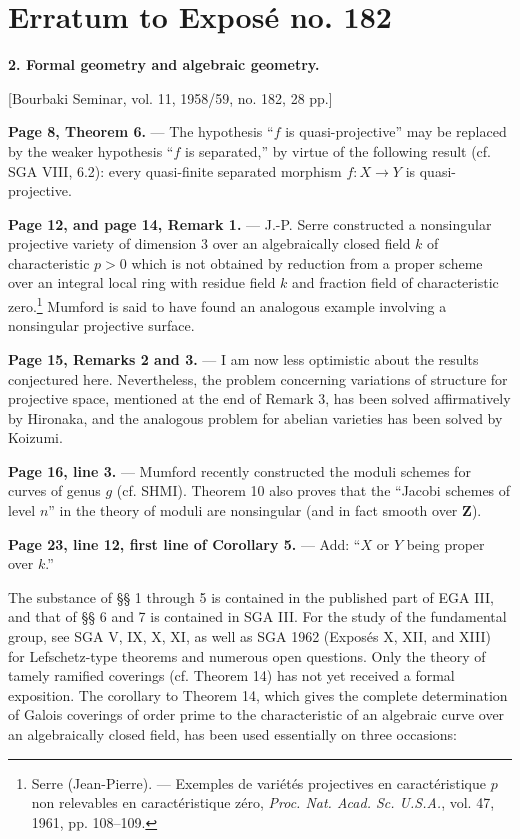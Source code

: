 \clearpage
\chapter*{Erratum to Exposé no. 182}
\setcounter{footnote}{1}

\noindent\textbf{2. Formal geometry and algebraic geometry.}

\begin{center}
[Bourbaki Seminar, vol. 11, 1958/59, no. 182, 28 pp.]
\end{center}

\noindent\textbf{Page 8, Theorem 6.} --- The hypothesis “$f$ is
quasi-projective” may be replaced by the weaker hypothesis “$f$ is separated,”
by virtue of the following result (cf. SGA VIII, 6.2): every quasi-finite
separated morphism $f:X\longrightarrow Y$ is quasi-projective.

\noindent\textbf{Page 12, and page 14, Remark 1.} --- J.-P. Serre constructed
a nonsingular projective variety of dimension 3 over an algebraically closed
field $k$ of characteristic $p>0$ which is not obtained by reduction from a
proper scheme over an integral local ring with residue field $k$ and fraction
field of characteristic zero.\footnote{Serre (Jean-Pierre). --- Exemples de
variétés projectives en caractéristique $p$ non relevables en caractéristique
zéro, \emph{Proc. Nat. Acad. Sc. U.S.A.}, vol. 47, 1961, pp. 108--109.} Mumford
is said to have found an analogous example involving a nonsingular projective
surface.

\noindent\textbf{Page 15, Remarks 2 and 3.} --- I am now less optimistic about
the results conjectured here. Nevertheless, the problem concerning variations
of structure for projective space, mentioned at the end of Remark 3, has been
solved affirmatively by Hironaka, and the analogous problem for abelian
varieties has been solved by Koizumi.

\noindent\textbf{Page 16, line 3.} --- Mumford recently constructed the moduli
schemes for curves of genus $g$ (cf. SHMI). Theorem 10 also proves that the
“Jacobi schemes of level $n$” in the theory of moduli are nonsingular (and in
fact smooth over $\mathbf Z$).

\noindent\textbf{Page 23, line 12, first line of Corollary 5.} --- Add: “$X$
or $Y$ being proper over $k$.”

The substance of §§ 1 through 5 is contained in the published part of EGA III,
and that of §§ 6 and 7 is contained in SGA III. For the study of the
fundamental group, see SGA V, IX, X, XI, as well as SGA 1962 (Exposés X, XII,
and XIII) for Lefschetz-type theorems and numerous open questions. Only the
theory of tamely ramified coverings (cf. Theorem 14) has not yet received a
formal exposition. The corollary to Theorem 14, which gives the complete
determination of Galois coverings of order prime to the characteristic of an
algebraic curve over an algebraically closed field, has been used essentially
on three occasions:

